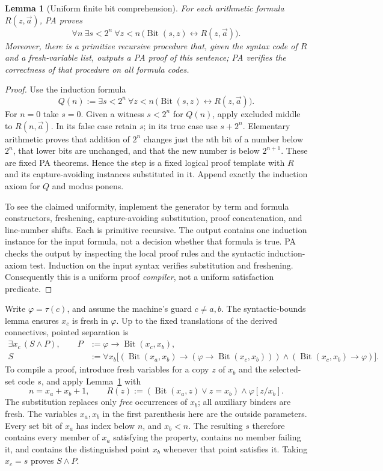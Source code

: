 \documentclass[11pt]{article}
\newtheorem{lemma}[theorem]{Lemma}
\newcommand{\Bit}{\operatorname{Bit}}
\newcommand{\tr}{\tau}
\begin{document}
\begin{lemma}[Uniform finite bit comprehension]\label{lem:comprehension}
For each arithmetic formula $R(z,\vec a)$, PA proves
\[
 \forall n\ \exists s<2^n\ \forall z<n\,
       \bigl(\Bit(s,z)\leftrightarrow R(z,\vec a)\bigr).
\]
Moreover, there is a primitive recursive procedure that, given the
syntax code of $R$ and a fresh-variable list, outputs a PA proof of
this sentence; PA verifies the correctness of that procedure on
all formula codes.
\end{lemma}
\begin{proof}
Use the induction formula
\[
 Q(n):=\exists s<2^n\ \forall z<n\,
       \bigl(\Bit(s,z)\leftrightarrow R(z,\vec a)\bigr).
\]
For $n=0$ take $s=0$.  Given a witness $s<2^n$ for $Q(n)$, apply
excluded middle to $R(n,\vec a)$.  In its false case retain $s$;
in its true case use $s+2^n$.  Elementary arithmetic proves that
addition of $2^n$ changes just the $n$th bit of a number below $2^n$,
that lower bits are unchanged, and that the new number is below
$2^{n+1}$.  These are fixed PA theorems.  Hence the step is a fixed
logical proof template with $R$ and its capture-avoiding instances
substituted in it.  Append exactly the induction axiom for $Q$ and
modus ponens.

To see the claimed uniformity, implement the generator by term and
formula constructors, freshening, capture-avoiding substitution,
proof concatenation, and line-number shifts.  Each is primitive
recursive.  The output contains one induction instance for the
input formula, not a decision whether that formula is true.
PA checks the output by inspecting the local proof rules and the
syntactic induction-axiom test.  Induction on the input syntax
verifies substitution and freshening.  Consequently this is a
uniform proof \emph{compiler}, not a uniform satisfaction predicate.
\end{proof}

Write $\varphi=\tr(c)$, and assume the machine's guard $c\ne a,b$.
The syntactic-bounds lemma ensures $x_c$ is fresh in $\varphi$.
Up to the fixed translations of the derived connectives, pointed
separation is
\begin{align*}
 \exists x_c\,(S\wedge P),\qquad
 P&:=\varphi\to\Bit(x_c,x_b),\\
 S&:=\forall x_b\bigl[
    (\Bit(x_a,x_b)\to(\varphi\to\Bit(x_c,x_b)))
    \wedge(\Bit(x_c,x_b)\to\varphi)\bigr].
\end{align*}
To compile a proof, introduce fresh variables for a copy $z$ of $x_b$
and the selected-set code $s$, and apply Lemma~\ref{lem:comprehension}
with
\[
 n=x_a+x_b+1,\qquad
 R(z):=(\Bit(x_a,z)\vee z=x_b)\wedge
          \varphi[z/x_b].
\]
The substitution replaces only \emph{free} occurrences of $x_b$;
all auxiliary binders are fresh.  The variables $x_a,x_b$ in the
first parenthesis here are the outside parameters.
Every set bit of $x_a$ has index below $n$, and $x_b<n$.  The resulting
$s$ therefore contains every member of $x_a$ satisfying the property,
contains no member failing it, and contains the distinguished point
$x_b$ whenever that point satisfies it.  Taking $x_c=s$ proves
$S\wedge P$.
\end{document}
